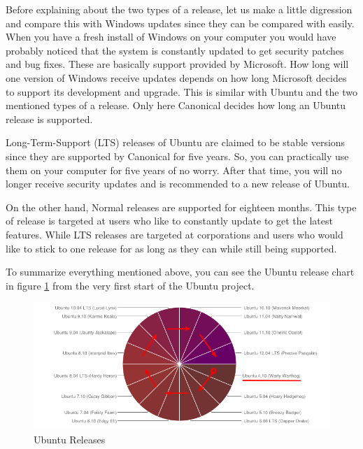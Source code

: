 \par \noindent Before explaining about the two types of a release, let us make a little digression and compare this with Windows updates since they can be compared with easily. When you have a fresh install of Windows on your computer you would have probably noticed that the system is constantly updated to get security patches and bug fixes. These are basically support provided by Microsoft. How long will one version of Windows receive updates depends on how long Microsoft decides to support its development and upgrade. This is similar with Ubuntu and the two mentioned types of a release. Only here Canonical  decides how long an Ubuntu release is supported. \\

\par \noindent Long-Term-Support (LTS) releases of Ubuntu are claimed to be stable versions since they are supported by Canonical for five years. So, you can practically use them on your computer for five years of no worry. After that time, you will no longer receive security updates and is recommended to a new release of Ubuntu.\\

\par \noindent On the other hand, Normal releases are supported for eighteen months. This type of release is targeted at users who like to constantly update to get the latest features. While LTS releases are targeted at corporations and users who would like to stick to one release for as long as they can while still being supported.\\

\par \noindent To summarize everything mentioned above, you can see the Ubuntu release chart in figure \ref{fig:ubuntu-releases} from the very first start of the Ubuntu project. \\

\begin{figure}[h]	
	\begin{center}
	\includegraphics[width=400pt]{./images/about-ubuntu/ubuntu-releases.png}
	\caption{Ubuntu Releases}	
	\label{fig:ubuntu-releases}	
	\end{center}
\end{figure}

